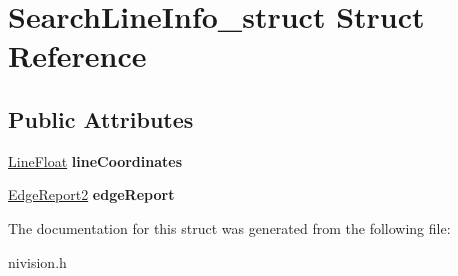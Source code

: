 \hypertarget{structSearchLineInfo__struct}{\section{\-Search\-Line\-Info\-\_\-struct \-Struct \-Reference}
\label{structSearchLineInfo__struct}
}
\subsection*{\-Public \-Attributes}
\begin{DoxyCompactItemize}
\item 
\hypertarget{structSearchLineInfo__struct_a02bcfb04529555056472f64f7ae74059}{\hyperlink{structLineFloat__struct}{\-Line\-Float} {\bfseries line\-Coordinates}}\label{structSearchLineInfo__struct_a02bcfb04529555056472f64f7ae74059}

\item 
\hypertarget{structSearchLineInfo__struct_a32f89487cd9d664c5a5676457bdf53c6}{\hyperlink{structEdgeReport2__struct}{\-Edge\-Report2} {\bfseries edge\-Report}}\label{structSearchLineInfo__struct_a32f89487cd9d664c5a5676457bdf53c6}

\end{DoxyCompactItemize}


\-The documentation for this struct was generated from the following file\-:\begin{DoxyCompactItemize}
\item 
nivision.\-h\end{DoxyCompactItemize}

